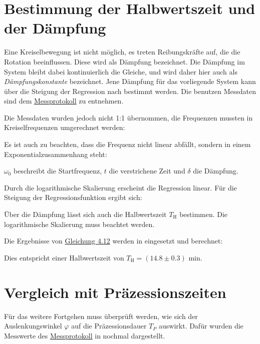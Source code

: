 \newpage

\section{Bestimmung der Halbwertszeit und der Dämpfung}
\label{sec:A1}
Eine Kreiselbewegung ist nicht möglich, es treten Reibungskräfte auf, die die Rotation beeinflussen. Diese wird als Dämpfung bezeichnet. 
Die Dämpfung im System bleibt dabei kontinuierlich die Gleiche, und wird daher hier auch als \emph{Dämpfungskonstante} bezeichnet.
Jene Dämpfung für das vorliegende System kann über die Steigung der Regression nach  bestimmt werden. Die benutzen Messdaten sind dem \hyperref[ch:Protokoll]{Messprotokoll} zu entnehmen. 

Die Messdaten wurden jedoch nicht 1:1 übernommen, die Frequenzen mussten in Kreiselfrequenzen umgerechnet werden:

Es ist auch zu beachten, dass die Frequenz nicht linear abfällt, sondern in einem Exponentialzusammenhang steht:

$\omega_0$ beschreibt die Startfrequenz, $t$ die verstrichene Zeit und $\delta$ die Dämpfung.


Durch die logarithmische Skalierung erscheint die Regression linear. Für die Steigung der Regressionsfunktion ergibt sich:

 \label{eq:delta_1}

Über die Dämpfung lässt sich auch die Halbwertszeit $T_\text{H}$ bestimmen. Die logarithmische Skalierung muss beachtet werden.


Die Ergebnisse von \hyperref[eq:delta_1]{Gleichung 4.12} werden in  eingesetzt und berechnet:


Dies entspricht einer Halbwertszeit von $T_\text{H} = (14.8 \pm 0.3)$ min. 

\section{Vergleich mit Präzessionszeiten}
\label{sec:A2}
Für das weitere Fortgehen muss überprüft werden, wie sich der Auslenkungswinkel $\varphi$ auf die Präzessionsdauer $T_P$ auswirkt. Dafür wurden die Messwerte des \hyperref[ch:Protokoll]{Messprotokoll} in  nochmal dargestellt.

